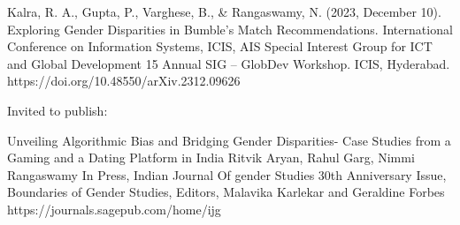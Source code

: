 \begin{enumerate}[label={[P\arabic*]}]  

    \item Kalra, R. A., Gupta, P., Varghese, B., \& Rangaswamy, N. (2023, December 10). Exploring Gender Disparities in Bumble’s Match Recommendations. International Conference on Information Systems, ICIS, AIS Special Interest Group for ICT and Global Development 15 Annual SIG – GlobDev Workshop. ICIS, Hyderabad. https://doi.org/10.48550/arXiv.2312.09626
 
\end{enumerate}
\noindent
Invited to publish:
\begin{enumerate}[start=2,label={[P\arabic*]}]

    \item Unveiling Algorithmic Bias and Bridging Gender Disparities- Case Studies from a Gaming and a Dating Platform in India
Ritvik Aryan, Rahul Garg, Nimmi Rangaswamy
In Press, Indian Journal Of gender Studies 30th Anniversary Issue, Boundaries of Gender Studies, Editors, Malavika Karlekar and Geraldine Forbes
https://journals.sagepub.com/home/ijg 

\end{enumerate}